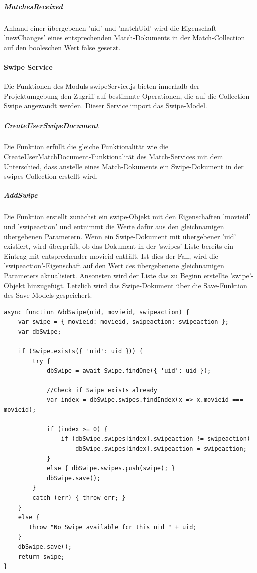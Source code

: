 \subparagraph{MatchesReceived}
Anhand einer übergebenen 'uid' und 'matchUid' wird die Eigenschaft 'newChanges' eines entsprechenden Match-Dokuments in der Match-Collection auf den booleschen Wert false gesetzt. 



%
%

\paragraph{Swipe Service}
Die Funktionen des Moduls swipeService.js bieten innerhalb der Projektumgebung den Zugriff auf bestimmte Operationen, die auf die Collection Swipe angewandt werden. Dieser Service import das Swipe-Model.

\subparagraph{CreateUserSwipeDocument}
Die Funktion erfüllt die gleiche Funktionalität wie die CreateUserMatchDocument-Funktionalität des Match-Services mit dem Unterschied, dass anstelle eines Match-Dokuments ein Swipe-Dokument in der swipes-Collection erstellt wird.

\subparagraph{AddSwipe}
Die Funktion erstellt zunächst ein swipe-Objekt mit den Eigenschaften 'movieid' und 'swipeaction' und entnimmt die Werte dafür aus den gleichnamigen übergebenen Parametern. 
Wenn ein Swipe-Dokument mit übergebener 'uid' existiert, wird überprüft, ob das Dokument in der 'swipes'-Liste bereits ein Eintrag mit entsprechender movieid enthält. Ist dies der Fall, wird die 'swipeaction'-Eigenschaft auf den Wert des übergebenene gleichnamigen Parameters aktualisiert. Ansonsten wird der Liste das zu Beginn erstellte 'swipe'-Objekt hinzugefügt. Letzlich wird das Swipe-Dokument über die Save-Funktion des Save-Models gespeichert.

\begin{lstlisting}[caption=Swipe Service - AddSwipe, label=lst:swipeserviceaddswipe]
async function AddSwipe(uid, movieid, swipeaction) {
    var swipe = { movieid: movieid, swipeaction: swipeaction };
    var dbSwipe;

    if (Swipe.exists({ 'uid': uid })) {
        try {
            dbSwipe = await Swipe.findOne({ 'uid': uid });

            //Check if Swipe exists already
            var index = dbSwipe.swipes.findIndex(x => x.movieid === movieid);

            if (index >= 0) {
                if (dbSwipe.swipes[index].swipeaction != swipeaction)
                    dbSwipe.swipes[index].swipeaction = swipeaction;
            }
            else { dbSwipe.swipes.push(swipe); }
            dbSwipe.save();
        }
        catch (err) { throw err; }
    }
    else {
       throw "No Swipe available for this uid " + uid;
    }
    dbSwipe.save();
    return swipe;
}
\end{lstlisting}

